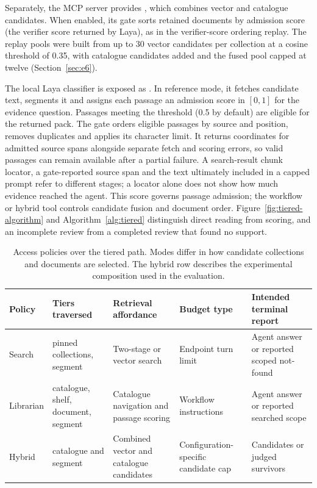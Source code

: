 Separately, the MCP server provides , which combines
vector and catalogue candidates. When enabled, its gate sorts retained
documents by admission score (the verifier score returned by Laya), as in the
verifier-score ordering replay. The replay pools were built from up to 30 vector candidates per collection at a
cosine threshold of 0.35, with catalogue candidates added and the fused pool
capped at twelve (Section~\ref{sec:e6}).

The local Laya classifier \cite{laya} is exposed as
. In reference mode, it fetches candidate text, segments
it and assigns each passage an admission score in $[0,1]$ for the evidence
question. Passages meeting the threshold (0.5 by default) are eligible for
the returned pack. The gate orders eligible passages by source and position, removes duplicates
and applies its character limit. It returns coordinates for admitted source
spans alongside separate fetch and scoring errors, so valid passages can
remain available after a partial failure. A search-result chunk locator, a
gate-reported source span and the text ultimately included in a capped prompt
refer to different stages; a locator alone does not show how much evidence
reached the agent. This score governs passage admission; the workflow or
hybrid tool controls candidate fusion and document order. Figure~\ref{fig:tiered-algorithm} and
Algorithm~\ref{alg:tiered} distinguish direct reading from scoring, and an
incomplete review from a completed review that found no support.

\begin{table}[t]
\centering
\small
\setlength{\tabcolsep}{5pt}
\caption{Access policies over the tiered path. Modes differ in how candidate collections and documents are selected.
The hybrid row describes the experimental composition used in the evaluation.}
\label{tab:lanes}
\begin{tabular}{@{}>{\raggedright\arraybackslash}p{}>{\raggedright\arraybackslash}p{}>{\raggedright\arraybackslash}p{}>{\raggedright\arraybackslash}p{}>{\raggedright\arraybackslash}p{}@{}}
\toprule
Policy & Tiers traversed & Retrieval affordance & Budget type & Intended terminal report\\
\midrule
Search & pinned collections, segment & Two-stage or vector search & Endpoint turn limit & Agent answer or reported scoped not-found\\
Librarian & catalogue, shelf, document, segment & Catalogue navigation and passage scoring & Workflow instructions & Agent answer or reported searched scope\\
Hybrid & catalogue and segment & Combined vector and catalogue candidates & Configuration-specific candidate cap & Candidates or judged survivors\\
\bottomrule
\end{tabular}
\end{table}

